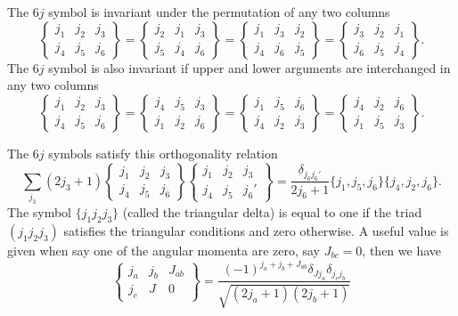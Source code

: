 \documentclass[graybox,sectrefs,envcountresetchap,open=right]{svmonodo}
\begin{document}
The $6j$ symbol is invariant under the permutation of any two columns
\[
    \begin{Bmatrix} j_1 & j_2 & j_3\\ j_4 & j_5 & j_6 \end{Bmatrix} = \begin{Bmatrix} j_2 & j_1 & j_3\\ j_5 & j_4 & j_6 \end{Bmatrix} = \begin{Bmatrix} j_1 & j_3 & j_2\\ j_4 & j_6 & j_5 \end{Bmatrix} = \begin{Bmatrix} j_3 & j_2 & j_1\\ j_6 & j_5 & j_4 \end{Bmatrix}. 
\]
The $6j$ symbol is also invariant if upper and lower arguments are interchanged in any two columns
\[
    \begin{Bmatrix} j_1 & j_2 & j_3\\ j_4 & j_5 & j_6 \end{Bmatrix} = \begin{Bmatrix} j_4 & j_5 & j_3\\ j_1 & j_2 & j_6 \end{Bmatrix} = \begin{Bmatrix} j_1 & j_5 & j_6\\ j_4 & j_2 & j_3 \end{Bmatrix} = \begin{Bmatrix} j_4 & j_2 & j_6\\ j_1 & j_5 & j_3 \end{Bmatrix}. 
\]


The $6j$ symbols satisfy this orthogonality relation
\[
    \sum_{j_3} (2j_3+1) \begin{Bmatrix} j_1 & j_2 & j_3\\ j_4 & j_5 & j_6 \end{Bmatrix} \begin{Bmatrix} j_1 & j_2 & j_3\\ j_4 & j_5 & j_6' \end{Bmatrix} = \frac{\delta_{j_6^{}j_6'}}{2j_6+1} \{j_1,j_5,j_6\} \{j_4,j_2,j_6\}. 
\]
The symbol $\{j_1j_2j_3\}$ (called the triangular delta) is equal to one if the triad $(j_1j_2j_3)$ satisfies the triangular conditions and zero otherwise.
A useful value is given when say one of the angular momenta are zero, say $J_{bc}=0$, then we have
\[
\left\{\begin{array}{ccc} j_a & j_b& J_{ab} \\ j_c & J & 0 \end{array}\right\}=\frac{(-1)^{j_a+j_b+J_{ab}}\delta_{Jj_a}\delta_{j_cj_b} }{\sqrt{(2j_{a}+1)(2j_{b}+1)}}
\]
\end{document}
